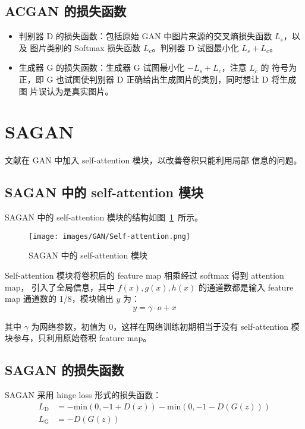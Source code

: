 \subsection{ACGAN 的损失函数}
\begin{itemize}
  \item 判别器 D 的损失函数：包括原始 GAN 中图片来源的交叉熵损失函数 $L_{s}$，以及
    图片类别的 Softmax 损失函数 $L_{c}$。判别器 D 试图最小化 $L_{s} + L_{c}$。
  \item 生成器 G 的损失函数：生成器 G 试图最小化 $-L_{s} + L_{c}$，注意 $L_{c}$ 的
    符号为正，即 G 也试图使判别器 D 正确给出生成图片的类别，同时想让 D 将生成图
    片误认为是真实图片。
\end{itemize}

\section{SAGAN}
文献在 GAN 中加入 self-attention 模块，以改善卷积只能利用局部
信息的问题。

\subsection{SAGAN 中的 self-attention 模块}
SAGAN 中的 self-attention 模块的结构如图~\ref{fig:self-attention}~所示。

\begin{figure}[ht]
  \centering
  \texttt{[image: images/GAN/Self-attention.png]}
  \caption{SAGAN 中的 self-attention 模块}
  \label{fig:self-attention}
\end{figure}

Self-attention 模块将卷积后的 feature map 相乘经过 softmax 得到 attention map，
引入了全局信息，其中 $f(x), g(x), h(x)$ 的通道数都是输入 feature map 通道数的
1/8，模块输出 $y$ 为：
\begin{equation}
  \label{equ:self-attention}
  y = \gamma \cdot o + x
\end{equation}

其中 $\gamma$ 为网络参数，初值为 0，这样在网络训练初期相当于没有 self-attention
模块参与，只利用原始卷积 feature map。

\subsection{SAGAN 的损失函数}
SAGAN 采用 hinge loss 形式的损失函数：
\begin{align}
  L_{\mathrm{D}} & = -\mathrm{min} \left( 0, -1 + D(x) \right) - \mathrm{min} \left( 0, -1-D(G(z)) \right) \\
  L_{\mathrm{G}} & = -D(G(z))
\end{align}

